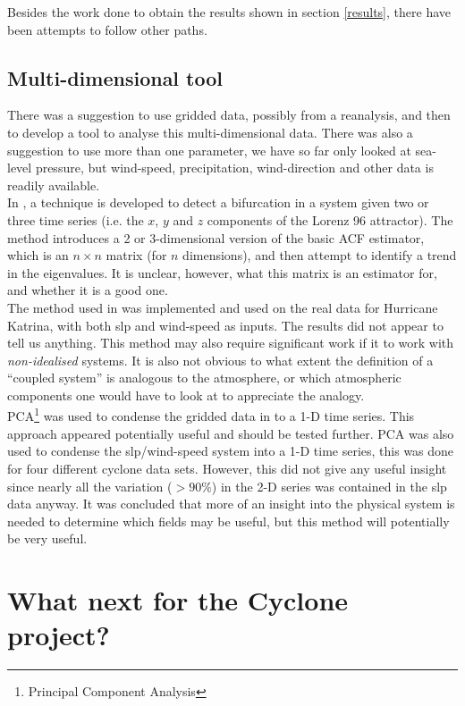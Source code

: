 \documentclass[11pt,a4paper,reqno]{article}
\numberwithin{equation}{section}
\begin{document}
Besides the work done to obtain the results shown in section \ref{results}, there have been attempts to follow other paths.

\subsection{Multi-dimensional tool}

There was a suggestion to use gridded data, possibly from a reanalysis, and then to develop a tool to analyse this multi-dimensional data. There was also a suggestion to use more than one parameter, we have so far only looked at sea-level pressure, but wind-speed, precipitation, wind-direction and other data is readily available.\\

In \cite{williamson2015}, a technique is developed to detect a bifurcation in a system given two or three time series (i.e. the $x$, $y$ and $z$ components of the Lorenz 96 attractor). The method introduces a 2 or 3-dimensional version of the basic ACF estimator, which is an $n\times n$ matrix (for $n$ dimensions), and then attempt to identify a trend in the eigenvalues. It is unclear, however, what this matrix is an estimator for, and whether it is a good one.\\

The method used in \cite{williamson2015} was implemented and used on the real data for Hurricane Katrina, with both slp and wind-speed as inputs. The results did not appear to tell us anything. This method may also require significant work if it to work with \emph{non-idealised} systems. It is also not obvious to what extent the definition of a ``coupled system'' is analogous to the atmosphere, or which atmospheric components one would have to look at to appreciate the analogy. \\


PCA\footnote{Principal Component Analysis} was used to condense the gridded data in to a 1-D time series. This approach appeared potentially useful and should be tested further. PCA was also used to condense the slp/wind-speed system into a 1-D time series, this was done for four different cyclone data sets. However, this did not give any useful insight since nearly all the variation ($>90\%$) in the 2-D series was contained in the slp data anyway. It was concluded that more of an insight into the physical system is needed to determine which fields may be useful, but this method will potentially be very useful.

\section{What next for the Cyclone project?}
\end{document}
